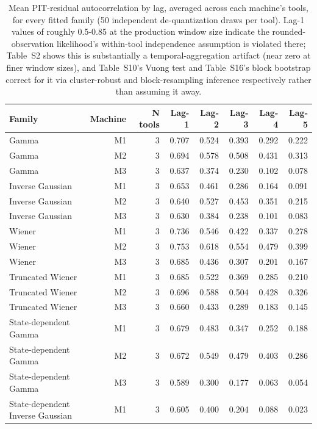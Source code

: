 \begin{table}[t]
\centering
\caption{Mean PIT-residual autocorrelation by lag, averaged across each machine's tools, for every fitted family (50 independent de-quantization draws per tool). Lag-1 values of roughly 0.5-0.85 at the production window size indicate the rounded-observation likelihood's within-tool independence assumption is violated there; Table~S2 shows this is substantially a temporal-aggregation artifact (near zero at finer window sizes), and Table~S10's Vuong test and Table~S16's block bootstrap correct for it via cluster-robust and block-resampling inference respectively rather than assuming it away.}
\label{tab:residual-autocorrelation}
\begin{tabular}{lrrrrrrr}
\toprule
Family & Machine & N tools & Lag-1 & Lag-2 & Lag-3 & Lag-4 & Lag-5 \\
\midrule
Gamma & M1 & 3 & 0.707 & 0.524 & 0.393 & 0.292 & 0.222 \\
Gamma & M2 & 3 & 0.694 & 0.578 & 0.508 & 0.431 & 0.313 \\
Gamma & M3 & 3 & 0.637 & 0.374 & 0.230 & 0.102 & 0.078 \\
Inverse Gaussian & M1 & 3 & 0.653 & 0.461 & 0.286 & 0.164 & 0.091 \\
Inverse Gaussian & M2 & 3 & 0.640 & 0.527 & 0.453 & 0.351 & 0.215 \\
Inverse Gaussian & M3 & 3 & 0.630 & 0.384 & 0.238 & 0.101 & 0.083 \\
Wiener & M1 & 3 & 0.736 & 0.546 & 0.422 & 0.337 & 0.278 \\
Wiener & M2 & 3 & 0.753 & 0.618 & 0.554 & 0.479 & 0.399 \\
Wiener & M3 & 3 & 0.685 & 0.436 & 0.307 & 0.201 & 0.167 \\
Truncated Wiener & M1 & 3 & 0.685 & 0.522 & 0.369 & 0.285 & 0.210 \\
Truncated Wiener & M2 & 3 & 0.696 & 0.588 & 0.504 & 0.428 & 0.326 \\
Truncated Wiener & M3 & 3 & 0.660 & 0.433 & 0.289 & 0.183 & 0.145 \\
State-dependent Gamma & M1 & 3 & 0.679 & 0.483 & 0.347 & 0.252 & 0.188 \\
State-dependent Gamma & M2 & 3 & 0.672 & 0.549 & 0.479 & 0.403 & 0.286 \\
State-dependent Gamma & M3 & 3 & 0.589 & 0.300 & 0.177 & 0.063 & 0.054 \\
State-dependent Inverse Gaussian & M1 & 3 & 0.605 & 0.400 & 0.204 & 0.088 & 0.023 \\

\end{tabular}
\end{table}
